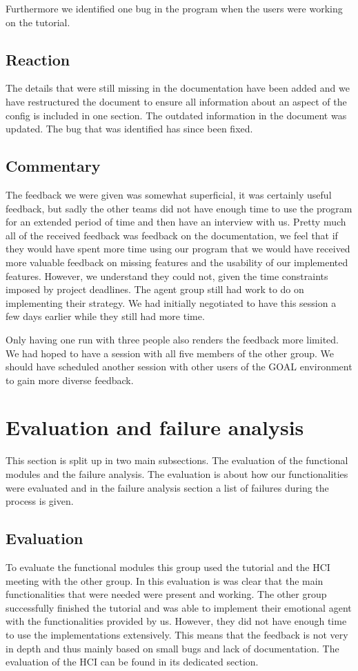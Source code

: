 \documentclass[11pt]{article}
\begin{document}
Furthermore we identified one bug in the program when the users were working on the tutorial. 
\subsection{Reaction}
The details that were still missing in the documentation have been added and we have restructured the document to ensure all information about an aspect of the config is included in one section. The outdated information in the document was updated. The bug that was identified has since been fixed.

\subsection{Commentary}
The feedback we were given was somewhat superficial, it was certainly useful feedback, but sadly the other teams did not have enough time to use the program for an extended period of time and then have an interview with us. Pretty much all of the received feedback was feedback on the documentation, we feel that if they would have spent more time using our program that we would have received more valuable feedback on missing features and the usability of our implemented features. However, we understand they could not, given the time constraints imposed by project deadlines. The agent group still had work to do on implementing their strategy. We had initially negotiated to have this session a few days earlier while they still had more time.

Only having one run with three people also renders the feedback more limited. We had hoped to have a session with all five members of the other group. We should have scheduled another session with other users of the GOAL environment to gain more diverse feedback.

\section{Evaluation and failure analysis}
This section is split up in two main subsections. The evaluation of the functional modules and the failure analysis. The evaluation is about how our functionalities were evaluated and in the failure analysis section a list of failures during the process is given.

\subsection{Evaluation}
To evaluate the functional modules this group used the tutorial and the HCI meeting with the other group. In this evaluation is was clear that the main functionalities that were needed were present and working. The other group successfully finished the tutorial and was able to implement their emotional agent with the functionalities provided by us. However, they did not have enough time to use the implementations extensively. This means that the feedback is not very in depth and thus mainly based on small bugs and lack of documentation. The evaluation of the HCI can be found in its dedicated section.
\end{document}
